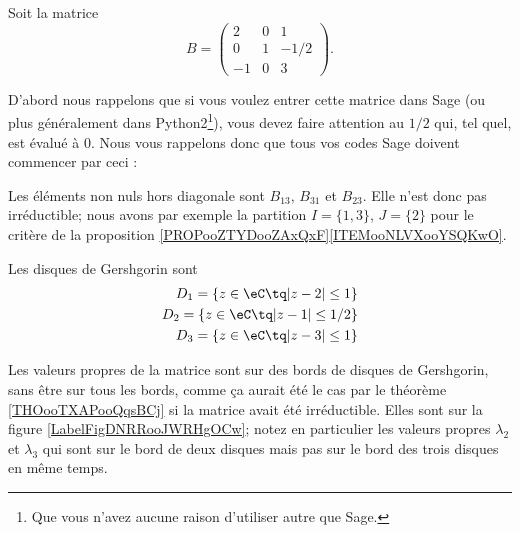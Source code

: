 \begin{example}     \label{EXooUKQIooQqteHx}

    Soit la matrice
    \begin{equation}
        B=\begin{pmatrix}
            2    &   0    &   1    \\
            0    &   1    &   -1/2    \\
            -1    &   0    &   3
        \end{pmatrix}.
    \end{equation}
    
    D'abord nous rappelons que si vous voulez entrer cette matrice dans Sage (ou plus généralement dans Python2\footnote{Que vous n'avez aucune raison d'utiliser autre que Sage.}), vous devez faire attention au \( 1/2\) qui, tel quel, est évalué à \( 0\). Nous vous rappelons donc que tous vos codes Sage doivent commencer par ceci :


    
    Les éléments non nuls hors diagonale sont \( B_{13}\), \( B_{31}\) et \( B_{23}\). Elle n'est donc pas irréductible; nous avons par exemple la partition \( I=\{ 1,3 \}\), \( J=\{ 2 \}\) pour le critère de la proposition \ref{PROPooZTYDooZAxQxF}\ref{ITEMooNLVXooYSQKwO}. 

    Les disques de Gershgorin sont
    \begin{subequations}
        \begin{align}
            D_1=\{ z\in \eC\tq | z-2 |\leq 1 \}\\
            D_2=\{ z\in \eC\tq | z-1 |\leq 1/2 \}\\
            D_3=\{ z\in \eC\tq | z-3 |\leq 1 \}
        \end{align}
    \end{subequations}

    Les valeurs propres de la matrice sont sur des bords de disques de Gershgorin, sans être sur tous les bords, comme ça aurait été le cas par le théorème \ref{THOooTXAPooQqsBCj} si la matrice avait été irréductible. Elles sont sur la figure \ref{LabelFigDNRRooJWRHgOCw}; notez en particulier les valeurs propres \( \lambda_2\) et \( \lambda_3\) qui sont sur le bord de deux disques mais pas sur le bord des trois disques en même temps.

\newcommand{\CaptionFigDNRRooJWRHgOCw}{Les disques de Gershgorin et les valeurs propres pour l'exemple \ref{EXooUKQIooQqteHx}.}


\end{example}

